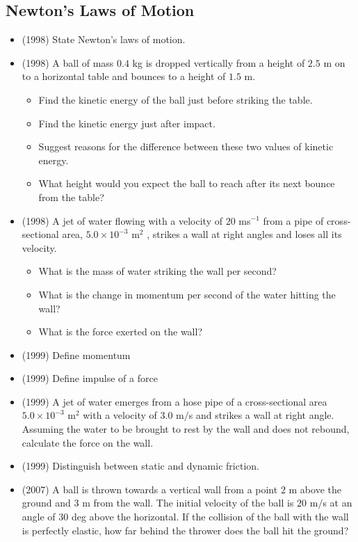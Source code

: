 \documentclass{article}
\begin{document}
\subsection{Newton’s Laws of Motion}
\begin{itemize}
\item (1998)  State Newton's laws of motion.
\item (1998)  A ball of mass $ 0.4$ kg is dropped vertically from a height of $ 2.5$ m on to a horizontal table and bounces to a height of $ 1.5$ m.\begin{itemize}
\item Find the kinetic energy of the ball just before striking the table.
\item Find the kinetic energy just after impact.
\item Suggest reasons for the difference between these two values of kinetic energy.
\item What height would you expect the ball to reach after its next bounce from the table?
\end{itemize}
\item (1998)  A jet of water flowing with a velocity of $ 20$ ms$ ^{-1}$ from a pipe of cross-sectional area, $ 5.0 \times 10^{-3}$ m$ ^{2}$ , strikes a wall at right angles and loses all its velocity.\begin{itemize}
\item What is the mass of water striking the wall per second?
\item What is the change in momentum per second of the water hitting the wall?
\item What is the force exerted on the wall?
\end{itemize}
\item (1999)  Define momentum
\item (1999)  Define impulse of a force
\item (1999)  A jet of water emerges from a hose pipe of a cross-sectional area $ 5.0\times 10^{-3}$ m​$ ^{2}$ with a velocity of $ 3.0$ m$/$s and strikes a wall at right angle. Assuming the water to be brought to rest by the wall and does not rebound, calculate the force on the wall.
\item (1999)  Distinguish between static and dynamic friction.
\item (2007)  A ball is thrown towards a vertical wall from a point $ 2$ m above the ground and $ 3$ m from the wall.  The initial velocity of the ball is $ 20$ m$/$s at an angle of $ 30$ deg above the horizontal.  If the collision of the ball with the wall is perfectly elastic, how far behind the thrower does the ball hit the ground?

\end{itemize}
\end{document}
